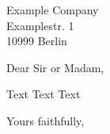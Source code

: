 \documentclass[
  letter,
  paper=a4,
  version=last,
  fontsize=11pt,
  DIV=13,
  BCOR=0mm,
  parskip=full,
]{scrlttr2}
\begin{document}

\begin{letter}{
  Example Company \\
  Examplestr. 1 \\
  10999 Berlin
}

\opening{Dear Sir or Madam,}

Text Text Text

\closing{Yours faithfully,}


\end{letter}
\end{document}
